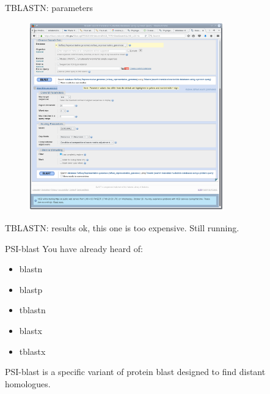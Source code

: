 \documentclass[pdf]{beamer}
\begin{document}
\begin{frame}{TBLASTN: parameters}
  \begin{figure}[ht]
    \includegraphics[width=0.75\textwidth]{images/ncbi_blast_4}
  \end{figure} 
\end{frame}

\begin{frame}{TBLASTN: results}
  ok, this one is too expensive. Still running.
\end{frame}

\begin{frame}{PSI-blast}
  You have already heard of:
  \begin{itemize}
  \item blastn
  \item blastp
  \item tblastn
  \item blastx
  \item tblastx
  \end{itemize}

  PSI-blast is a specific variant of protein blast designed to find distant homologues.

\end{frame}
\end{document}
